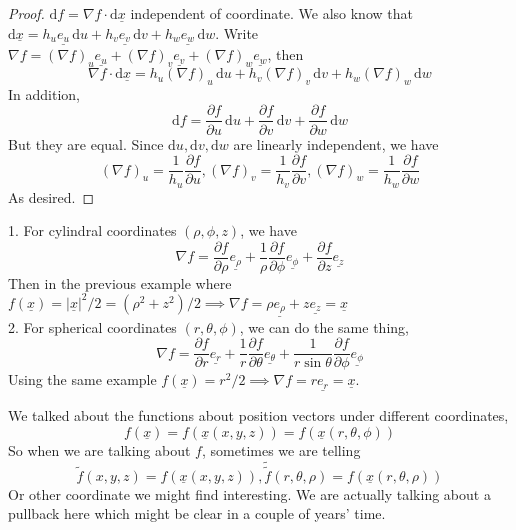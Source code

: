 \begin{proof}
    $\mathrm df=\nabla f\cdot\mathrm d\underline{x}$ independent of coordinate.
    We also know that $\mathrm d\underline{x}=h_u\underline{e_u}\,\mathrm du+h_v\underline{e_v}\,\mathrm dv+h_w\underline{e_w}\,\mathrm dw$.
    Write $\nabla f=(\nabla f)_u\underline{e_u}+(\nabla f)_v\underline{e_v}+(\nabla f)_w\underline{e_w}$, then
    $$\nabla f\cdot \mathrm d\underline{x}=h_u(\nabla f)_u\,\mathrm du+h_v(\nabla f)_v\,\mathrm dv+h_w(\nabla f)_w\,\mathrm dw$$
    In addition,
    $$\mathrm df=\frac{\partial f}{\partial u}\,\mathrm du+\frac{\partial f}{\partial v}\,\mathrm dv+\frac{\partial f}{\partial w}\,\mathrm dw$$
    But they are equal.
    Since $\mathrm du,\mathrm dv,\mathrm dw$ are linearly independent, we have
    $$(\nabla f)_u=\frac{1}{h_u}\frac{\partial f}{\partial u},(\nabla f)_v=\frac{1}{h_v}\frac{\partial f}{\partial v},(\nabla f)_w=\frac{1}{h_w}\frac{\partial f}{\partial w}$$
    As desired.
\end{proof}
\begin{example}
    1. For cylindral coordinates $(\rho,\phi,z)$, we have
    $$\nabla f=\frac{\partial f}{\partial\rho}\underline{e_\rho}+\frac{1}{\rho}\frac{\partial f}{\partial\phi}\underline{e_\phi}+\frac{\partial f}{\partial z}\underline{e_z}$$
    Then in the previous example where $f(\underline{x})=|\underline{x}|^2/2=(\rho^2+z^2)/2\implies\nabla f=\rho\underline{e_\rho}+z\underline{e_z}=\underline{x}$\\
    2. For spherical coordinates $(r,\theta,\phi)$, we can do the same thing,
    $$\nabla f=\frac{\partial f}{\partial r}\underline{e_r}+\frac{1}{r}\frac{\partial f}{\partial\theta}\underline{e_\theta}+\frac{1}{r\sin\theta}\frac{\partial f}{\partial \phi}\underline{e_\phi}$$
    Using the same example $f(\underline{x})=r^2/2\implies \nabla f=r\underline{e_r}=\underline{x}$.
\end{example}
\begin{note}
    We talked about the functions about position vectors under different coordinates,
    $$f(\underline{x})=f(\underline{x}(x,y,z))=f(\underline{x}(r,\theta,\phi))$$
    So when we are talking about $f$, sometimes we are telling
    $$\tilde{f}(x,y,z)=f(\underline{x}(x,y,z)),\tilde{\tilde{f}}(r,\theta,\rho)=f(\underline{x}(r,\theta,\rho))$$
    Or other coordinate we might find interesting.
    We are actually talking about a pullback here which might be clear in a couple of years' time.
\end{note}